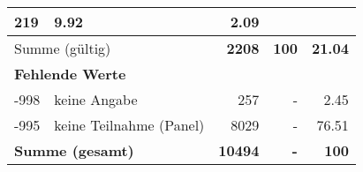 \begin{longtable}{lXrrr}
       \num{219} &
       \num[round-mode=places,round-precision=2]{9.92} &
         \num[round-mode=places,round-precision=2]{2.09} \\
     \midrule
     \multicolumn{2}{l}{Summe (gültig)} &
       \textbf{\num{2208}} &
     \textbf{\num{100}} &
       \textbf{\num[round-mode=places,round-precision=2]{21.04}} \\
     \multicolumn{5}{l}{\textbf{Fehlende Werte}}\\
       -998 &
       keine Angabe &
         \num{257} &
        - &
         \num[round-mode=places,round-precision=2]{2.45} \\
       -995 &
       keine Teilnahme (Panel) &
         \num{8029} &
        - &
         \num[round-mode=places,round-precision=2]{76.51} \\
     \midrule
     \multicolumn{2}{l}{\textbf{Summe (gesamt)}} &
          \textbf{\num{10494}} &
        \textbf{-} &
        \textbf{\num{100}} \\
     \bottomrule
     \end{longtable}
     
